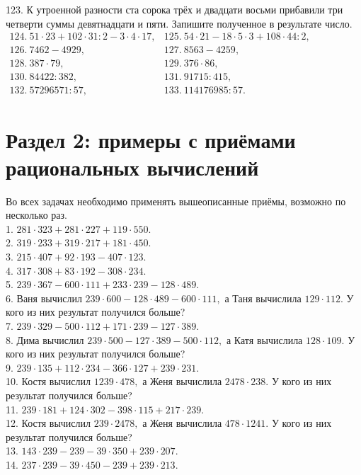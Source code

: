\documentclass[12pt]{article}
\begin{document}
123. К утроенной разности ста сорока трёх и двадцати восьми прибавили три четверти суммы девятнадцати и пяти. Запишите полученное в результате число.\\
$\begin{array}{lll}
124.\ 51 \cdot 23 + 102 \cdot 31 : 2 - 3 \cdot 4 \cdot 17,& 125.\ 54 \cdot 21 - 18 \cdot 5 \cdot 3 + 108 \cdot 44 : 2,\\
126.\ 7462-4929,& 127.\ 8563-4259,\\
128.\ 387\cdot79,& 129.\ 376\cdot86,\\
130.\ 84422:382,& 131.\ 91715:415,\\
132.\ 57296571 : 57, & 133.\ 114176985 : 57.
\end{array}$
\newpage
\section{Раздел 2: примеры с приёмами рациональных вычислений}
Во всех задачах необходимо применять вышеописанные приёмы, возможно по несколько раз.\\
1. $281\cdot323+281\cdot227+119\cdot550.$\\
2. $319\cdot233+319\cdot217+181\cdot450.$\\
3. $215\cdot407+92\cdot193-407\cdot123.$\\
4. $317\cdot308+83\cdot192-308\cdot234.$\\
5. $239\cdot367-600\cdot111+233\cdot239-128\cdot489.$\\
6. Ваня вычислил $239\cdot600-128\cdot489-600\cdot111,$ а Таня вычислила $129\cdot112.$ У кого из них результат получился больше?\\
7. $239\cdot329-500\cdot112+171\cdot239-127\cdot389.$\\
8. Дима вычислил $239\cdot500-127\cdot389-500\cdot112,$ а Катя вычислила $128\cdot109.$ У кого из них результат получился больше?\\
9. $239\cdot135+112\cdot234-366\cdot127+239\cdot231.$\\
10. Костя вычислил $1239\cdot 478,$ а Женя вычислила $2478\cdot238.$ У кого из них результат получился больше?\\
11. $239\cdot181+124\cdot302-398\cdot115+217\cdot239.$\\
12. Костя вычислил $239\cdot2478,$ а Женя вычислила $478\cdot1241.$ У кого из них результат получился больше?\\
13. $143\cdot239-239-39\cdot350+239\cdot207.$\\
14. $237\cdot239-39\cdot450-239+239\cdot213.$\\
\end{document}

